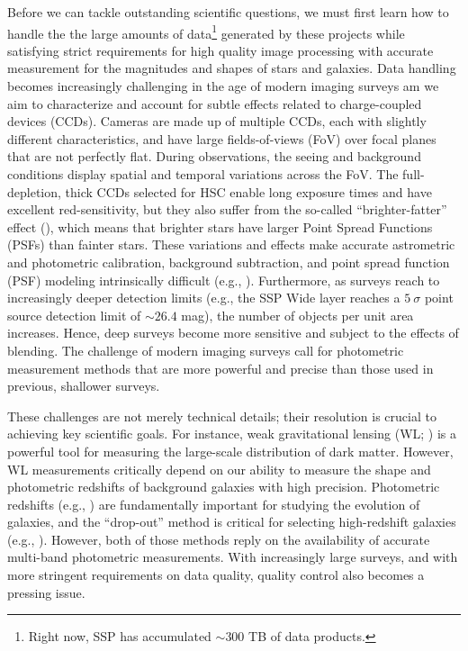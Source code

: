 \documentclass[useamsfonts]{pasj01}
\begin{document}
    Before we can tackle outstanding scientific questions, we must first learn
    how to handle the the large amounts of data\footnote{Right now, SSP has accumulated
    ${\sim}300$ TB of data products.} generated by these projects while satisfying  strict requirements for  high quality image processing with accurate measurement for the magnitudes and shapes of stars and galaxies. Data handling becomes increasingly challenging in the age of modern imaging
    surveys am we aim to characterize and account for subtle effects related to charge-coupled devices (CCDs). Cameras are made up of multiple CCDs, each with slightly different
    characteristics, and have large fields-of-views (FoV) over focal planes that are not perfectly flat. During observations, the seeing and background conditions display spatial and temporal variations across the FoV. The full-depletion, thick CCDs selected for HSC enable long exposure
    times and have excellent red-sensitivity, but they also suffer from the
    so-called ``brighter-fatter'' effect (\citealt{Antilogus2014}), which means that
    brighter stars have larger Point Spread Functions (PSFs) than fainter stars. These variations and effects make accurate astrometric and photometric calibration,
    background subtraction, and point spread function (PSF) modeling intrinsically
    difficult (e.g., \citealt{Schlafly2012}). Furthermore, as surveys reach to increasingly deeper detection limits
    (e.g., the SSP Wide layer reaches a $5\ \sigma$ point source detection limit of
    ${\sim}26.4$ mag), the number of objects per unit area increases.  Hence, deep surveys become  more sensitive and subject to the effects of blending.  The challenge of modern imaging surveys call for  photometric measurement methods
    that are more powerful and precise than those used in previous, shallower surveys.
    
    
    
    These challenges are not merely technical details; their resolution is crucial
    to achieving key scientific goals.
    For instance, weak gravitational lensing (WL; \citealt{Kaiser1993, Bartelmann2001})
    is a powerful tool for measuring the large-scale distribution of dark matter.
    However, WL measurements critically depend on our ability to measure the shape and photometric redshifts of background galaxies with high precision. Photometric redshifts (e.g., \citealt{Benitez2000, Bolzonella2000,
    Ilbert2009}) are fundamentally important for studying the evolution of galaxies,
    and the ``drop-out'' method is critical for selecting high-redshift galaxies
    (e.g., \citealt{Steidel1996}).
    However, both of those methods reply on the availability of accurate multi-band photometric
    measurements. With increasingly large surveys,  and with more stringent requirements on data quality,  quality control also becomes a pressing issue. 
    
\end{document}
